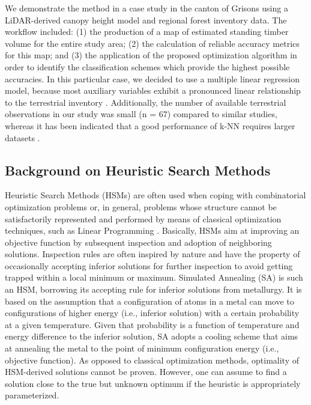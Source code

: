 We demonstrate the method in a case study in the canton of Grisons using a LiDAR-derived canopy height model and regional forest inventory data. The workflow included: (1) the production of a map of estimated standing timber volume for the entire study area; (2) the calculation of reliable accuracy metrics for this map; and (3) the application of the proposed optimization algorithm in order to identify the classification schemes which provide the highest possible accuracies. In this particular case, we decided to use a multiple linear regression model, because most auxiliary variables exhibit a pronounced linear relationship to the terrestrial inventory \citep{hill2013}. Additionally, the number of available terrestrial observations in our study was small (n = 67) compared to similar studies, whereas it has been indicated that a good performance of k-NN requires larger datasets \citep{fehrmann2008, magnussen2010}.

\subsection{Background on Heuristic Search Methods}
\label{sec:HSM_theory}

Heuristic Search Methods (HSMs) are often used when coping with combinatorial optimization problems \citep{pirlot1996} or, in general, problems whose structure cannot be satisfactorily represented and performed by means of classical optimization techniques, such as Linear Programming \citep{rayward1996}. Basically, HSMs aim at improving an objective function by subsequent inspection and adoption of neighboring solutions. Inspection rules are often inspired by nature \citep{pirlot1996} and have the property of occasionally accepting inferior solutions for further inspection to avoid getting trapped within a local minimum or maximum. Simulated Annealing (SA) \citep{kirkpatrick1983} is such an HSM, borrowing its accepting rule for inferior solutions from metallurgy. It is based on the assumption that a configuration of atoms in a metal can move to configurations of higher energy (i.e., inferior solution) with a certain probability at a given temperature. Given that probability is a function of temperature and energy difference to the inferior solution, SA adopts a cooling scheme that aims at annealing the metal to the point of minimum configuration energy (i.e., objective function). As opposed to classical optimization methods, optimality of HSM-derived solutions cannot be proven. However, one can assume to find a solution close to the true but unknown optimum if the heuristic is appropriately parameterized.

